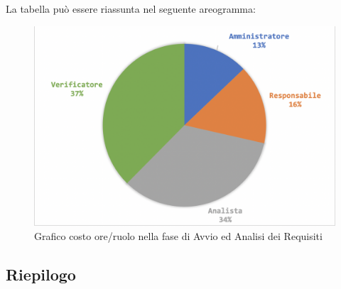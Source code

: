 			La tabella può essere riassunta nel seguente areogramma:
			\begin{figure}[H]
				\centering
				\includegraphics[width=0.8\linewidth]{./images/grafo2.png}
				\caption{Grafico costo ore/ruolo nella fase di Avvio ed Analisi dei Requisiti}
				\label{fig:grafico costi ruolo}
			\end{figure}
		
		
		
	\subsection{Riepilogo}